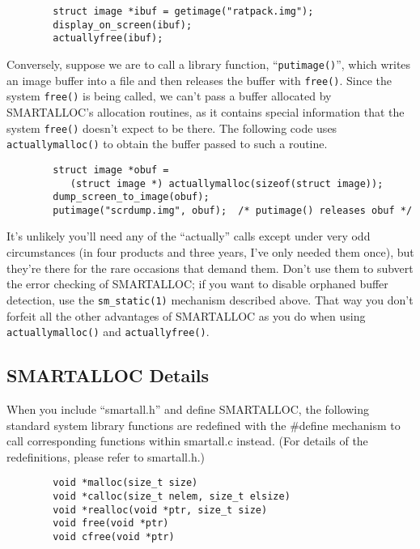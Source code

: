 \footnotesize
\begin{verbatim}
        struct image *ibuf = getimage("ratpack.img");
        display_on_screen(ibuf);
        actuallyfree(ibuf);
\end{verbatim}
\normalsize

Conversely, suppose we are to call a library function, ``{\tt putimage()}'',
which writes an image buffer into a file and then releases the buffer with
{\tt free()}. Since the system {\tt free()} is being called, we can't pass a
buffer allocated by SMARTALLOC's allocation routines, as it contains special
information that the system {\tt free()} doesn't expect to be there. The
following code uses {\tt actuallymalloc()} to obtain the buffer passed to such
a routine.

\footnotesize
\begin{verbatim}
        struct image *obuf =
           (struct image *) actuallymalloc(sizeof(struct image));
        dump_screen_to_image(obuf);
        putimage("scrdump.img", obuf);  /* putimage() releases obuf */
\end{verbatim}
\normalsize

It's unlikely you'll need any of the ``actually'' calls except under very odd
circumstances (in four products and three years, I've only needed them once),
but they're there for the rare occasions that demand them. Don't use them to
subvert the error checking of SMARTALLOC; if you want to disable orphaned
buffer detection, use the {\tt sm\_static(1)} mechanism described above. That
way you don't forfeit all the other advantages of SMARTALLOC as you do when
using {\tt actuallymalloc()} and {\tt actuallyfree()}.

\subsection{ SMARTALLOC Details}

When you include ``smartall.h'' and define SMARTALLOC, the following standard
system library functions are redefined with the \#define mechanism to call
corresponding functions within smartall.c instead. (For details of the
redefinitions, please refer to smartall.h.)

\footnotesize
\begin{verbatim}
        void *malloc(size_t size)
        void *calloc(size_t nelem, size_t elsize)
        void *realloc(void *ptr, size_t size)
        void free(void *ptr)
        void cfree(void *ptr)
\end{verbatim}
\normalsize

